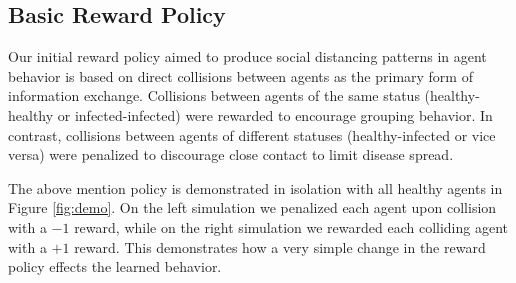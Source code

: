 \documentclass[9pt]{IEEEtran}
\begin{document}
\subsection{Basic Reward Policy}

Our initial reward policy aimed to produce social distancing patterns in agent behavior is based on direct collisions between agents as the primary form of information exchange. Collisions between agents of the same status (healthy-healthy or infected-infected) were rewarded to encourage grouping behavior. In contrast, collisions between agents of different statuses (healthy-infected or vice versa) were penalized to discourage close contact to limit disease spread.

The above mention policy is demonstrated in isolation with all healthy agents in Figure \ref{fig:demo}. On the left simulation we penalized each agent upon collision with a $-1$ reward, while on the right simulation we rewarded each colliding agent with a $+1$ reward. This demonstrates how a very simple change in the reward policy effects the learned behavior.
\end{document}
